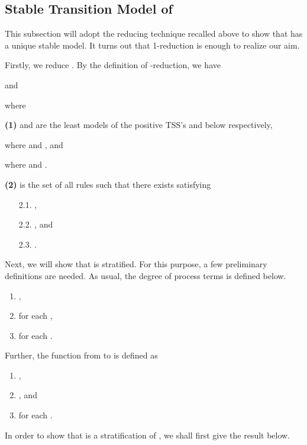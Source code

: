 \documentclass{elsarticle}
\theoremstyle{plain}
\theoremstyle{definition}
\begin{document}
\subsection{Stable Transition Model of }


    This subsection will adopt the reducing technique recalled above to show that  has a unique stable model. It turns out that 1-reduction is enough to realize our aim.


    Firstly, we reduce . By the definition of -reduction, we have
    
    and
    
    where

\noindent    \textbf{(1)}  and  are the least models of the positive TSS's   and  below respectively,

where  and , and

where  and .

\noindent  \textbf{(2)}  is the set of all rules  such that there exists  satisfying
    \begin{enumerate}
      \item [2.1.] ,
      \item [2.2.] , and
      \item [2.3.] .
    \end{enumerate}

Next, we will show that  is stratified.
For this purpose, a few preliminary definitions are needed.
As usual, the degree of process terms is defined below.
\begin{enumerate}
  \item ,
  \item  for each ,
  \item  for each .
\end{enumerate}

Further, the function  from   to  is defined as
\begin{enumerate}
  \item ,
  \item , and
  \item  for each .
\end{enumerate}

In order to show that  is a stratification of , we shall first give the result below.
\end{document}
